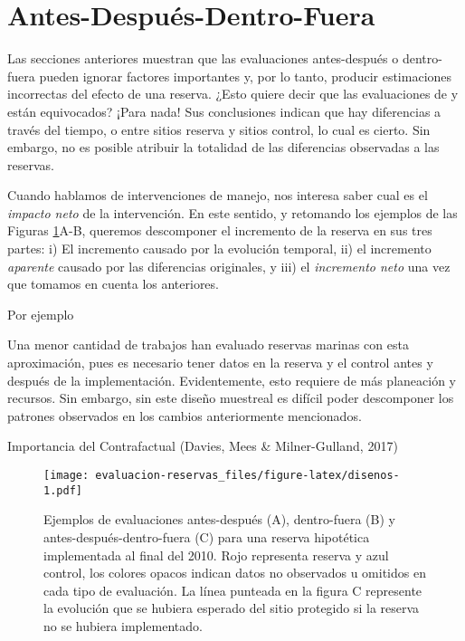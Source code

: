 \documentclass[]{krantz}
\begin{document}
\hypertarget{antes-despues-dentro-fuera}{%
\section{Antes-Después-Dentro-Fuera}\label{antes-despues-dentro-fuera}}

Las secciones anteriores muestran que las evaluaciones antes-después o
dentro-fuera pueden ignorar factores importantes y, por lo tanto,
producir estimaciones incorrectas del efecto de una reserva. ¿Esto
quiere decir que las evaluaciones de \citet{wantiez_1997} y
\citet{guidetti_2014} están equivocados? ¡Para nada! Sus conclusiones
indican que hay diferencias a través del tiempo, o entre sitios reserva
y sitios control, lo cual es cierto. Sin embargo, no es posible atribuir
la totalidad de las diferencias observadas a las reservas.

Cuando hablamos de intervenciones de manejo, nos interesa saber cual es
el \emph{impacto neto} de la intervención. En este sentido, y retomando
los ejemplos de las Figuras \ref{fig:disenos}A-B, queremos descomponer
el incremento de la reserva en sus tres partes: i) El incremento causado
por la evolución temporal, ii) el incremento \emph{aparente} causado por
las diferencias originales, y iii) el \emph{incremento neto} una vez que
tomamos en cuenta los anteriores.

Por ejemplo \citep{moland_2013, villasenorderbez_2018}

Una menor cantidad de trabajos han evaluado reservas marinas con esta
aproximación, pues es necesario tener datos en la reserva y el control
antes y después de la implementación. Evidentemente, esto requiere de
más planeación y recursos. Sin embargo, sin este diseño muestreal es
difícil poder descomponer los patrones observados en los cambios
anteriormente mencionados.

Importancia del Contrafactual (Davies, Mees \& Milner-Gulland, 2017)

\begin{figure}
\centering
\texttt{[image: evaluacion-reservas\_files/figure-latex/disenos-1.pdf]}
\caption{\label{fig:disenos}Ejemplos de evaluaciones antes-después (A),
dentro-fuera (B) y antes-después-dentro-fuera (C) para una reserva
hipotética implementada al final del 2010. Rojo representa reserva y
azul control, los colores opacos indican datos no observados u omitidos
en cada tipo de evaluación. La línea punteada en la figura C represente
la evolución que se hubiera esperado del sitio protegido si la reserva
no se hubiera implementado.}
\end{figure}
\end{document}
